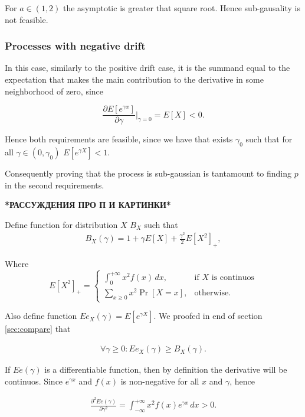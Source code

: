 \documentclass[12pt, a4paper]{article}
\theoremstyle{remark}
\newcommand{\infint}[1]{\int_{-\infty}^{+\infty} #1 \, dx}
\begin{document}
For $a \in (1, 2)$ the asymptotic is greater that square root. Hence sub-gausality is not feasible.

\subsubsection{Processes with negative drift}

In this case, similarly to the positive drift case, it is the summand equal to the expectation that makes the main contribution to the derivative in some neighborhood of zero, since

$$\frac{\partial E[e^{\gamma x}]}{\partial \gamma} \Big|_{\gamma = 0} = E[X] < 0.$$

Hence both requirements are feasible, since we have that exists \(\gamma_0\) such that for all \(\gamma \in (0, \gamma_0)\) $E[e^{\gamma X}] < 1.$

Consequently proving that the process is sub-gaussian is tantamount to finding $p$ in the second requirements.

\hfill

\textbf{*РАССУЖДЕНИЯ ПРО П И КАРТИНКИ*}

\hfill

Define function for distribution $X$ $B_X$ such that
\begin{align*}
    B_X(\gamma) = 1 + \gamma E[X] + \frac{\gamma^2}{2} E[X^2]_+,
\end{align*}

Where
\[
E[X^2]_+= 
\begin{cases}
    \int_0^{+\infty} x^2 f(x)\, dx,& \text{if $X$ is continuos}\\
    \sum_{x \geq 0} x^2 \Pr[X = x],              & \text{otherwise}.
\end{cases}
\]

Also define function $Ee_X(\gamma) = E[e^{\gamma X}]$. We proofed in end of section \ref*{sec:compare} that

\begin{align*}
    \forall \gamma\geq 0: Ee_X(\gamma) \geq B_X(\gamma).
\end{align*}

If $Ee(\gamma)$ is a differentiable function, then by definition the derivative will be continuos. Since $e^{\gamma x}$ and $f(x)$ is non-negative for all $x$ and $\gamma$, hence

\begin{align*}
    \frac{\partial^2 Ee(\gamma)}{\partial\gamma^2} = \infint{x^2 f(x) e^{\gamma x}} > 0.
\end{align*}
\end{document}
